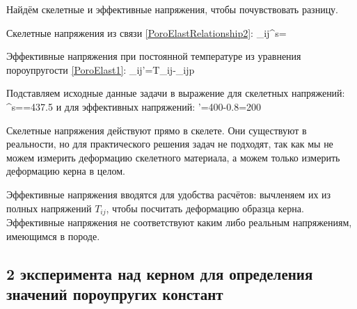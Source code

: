 \documentclass[main.tex]{subfiles}
\begin{document}
Найдём скелетные и эффективные напряжения, чтобы почувствовать разницу.

Скелетные напряжения из связи \eqref{PoroElastRelationship2}:
\beq
\sigma_{ij}^s=
\eeq

Эффективные напряжения при постоянной температуре из уравнения пороупругости \eqref{PoroElast1}:
\beq
\sigma_{ij}'=T_{ij}-\alpha_{ij}p
\eeq

Подставляем исходные данные задачи в выражение для скелетных напряжений:
\beq
\sigma^s==437.5
\eeq
и для эффективных напряжений:
\beq
\sigma'=400-0.8=200
\eeq

Скелетные напряжения действуют прямо в скелете. Они существуют в реальности, но для практического решения задач не подходят, так как мы не можем измерить деформацию скелетного материала, а можем только измерить деформацию керна в целом.

Эффективные напряжения вводятся для удобства расчётов: вычленяем их из полных напряжений $T_{ij}$, чтобы посчитать деформацию образца керна. Эффективные напряжения не соответствуют каким либо реальным напряжениям, имеющимся в породе.

\subsection{2 эксперимента над керном для определения значений пороупругих констант}
\end{document}
